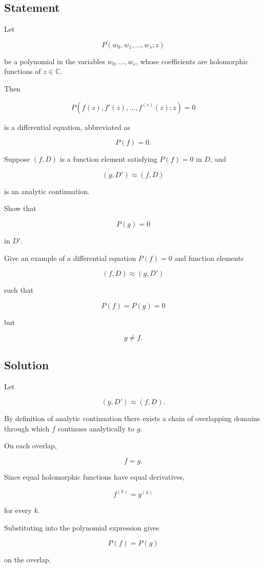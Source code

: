 \documentclass[12pt,a4paper]{article}
\theoremstyle{notespace}
\begin{document}
\subsection*{Statement}

Let

\[
P(w_0,w_1,\ldots,w_s;z)
\]

be a polynomial in the variables \(w_0,\ldots,w_s\), whose coefficients are holomorphic functions of \(z\in\mathbb C\).

Then

\[
P(f(z),f'(z),\ldots,f^{(s)}(z);z)=0
\]

is a differential equation, abbreviated as

\[
P(f)=0.
\]

Suppose \((f,D)\) is a function element satisfying \(P(f)=0\) in \(D\), and

\[
(g,D')\approx(f,D)
\]

is an analytic continuation.

Show that

\[
P(g)=0
\]

in \(D'\).

Give an example of a differential equation \(P(f)=0\) and function elements

\[
(f,D)\approx(g,D')
\]

such that

\[
P(f)=P(g)=0
\]

but

\[
g\neq f.
\]

\subsection*{Solution}

Let

\[
(g,D')\approx(f,D).
\]

By definition of analytic continuation there exists a chain of overlapping domains through which \(f\) continues analytically to \(g\).

On each overlap,

\[
f=g.
\]

Since equal holomorphic functions have equal derivatives,

\[
f^{(k)}=g^{(k)}
\]

for every \(k\).

Substituting into the polynomial expression gives

\[
P(f)=P(g)
\]

on the overlap.
\end{document}
